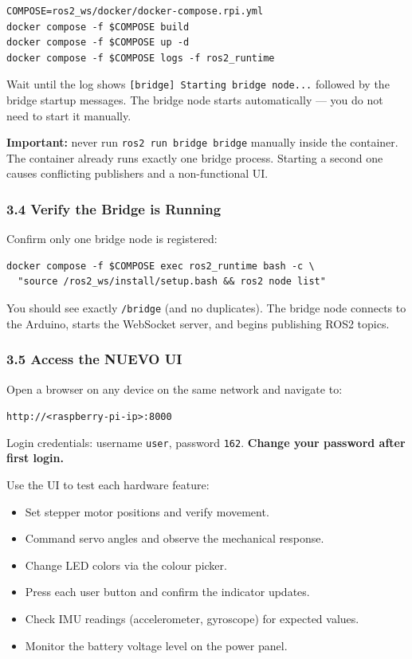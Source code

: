 \documentclass{ol-softwaremanual}
\begin{document}
\begin{verbatim}
COMPOSE=ros2_ws/docker/docker-compose.rpi.yml
docker compose -f $COMPOSE build
docker compose -f $COMPOSE up -d
docker compose -f $COMPOSE logs -f ros2_runtime
\end{verbatim}

Wait until the log shows \texttt{[bridge] Starting bridge node...} followed by the bridge
startup messages.
The bridge node starts automatically --- you do not need to start it manually.

\textbf{Important:} never run \texttt{ros2 run bridge bridge} manually inside the container.
The container already runs exactly one bridge process.
Starting a second one causes conflicting publishers and a non-functional UI.

\subsubsection*{3.4 Verify the Bridge is Running}

Confirm only one bridge node is registered:

\begin{verbatim}
docker compose -f $COMPOSE exec ros2_runtime bash -c \
  "source /ros2_ws/install/setup.bash && ros2 node list"
\end{verbatim}

You should see exactly \texttt{/bridge} (and no duplicates).
The bridge node connects to the Arduino, starts the WebSocket server, and begins
publishing ROS2 topics.

\subsubsection*{3.5 Access the NUEVO UI}

Open a browser on any device on the same network and navigate to:
\begin{center}
  \texttt{http://<raspberry-pi-ip>:8000}
\end{center}

Login credentials: username \texttt{user}, password \texttt{162}.
\textbf{Change your password after first login.}

Use the UI to test each hardware feature:
\begin{itemize}
  \item Set stepper motor positions and verify movement.
  \item Command servo angles and observe the mechanical response.
  \item Change LED colors via the colour picker.
  \item Press each user button and confirm the indicator updates.
  \item Check IMU readings (accelerometer, gyroscope) for expected values.
  \item Monitor the battery voltage level on the power panel.
\end{itemize}
\end{document}

